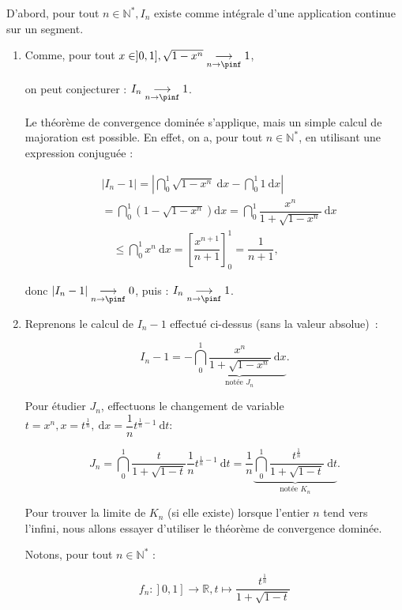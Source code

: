 

D'abord, pour tout $n \in \mathbb{N}^{*}, I_{n}$ existe comme intégrale d'une application continue sur un segment.
\begin{enumerate}
\item Comme, pour tout $x \in] 0,1], \sqrt{1-x^{n}} \underset{n\to\pinf}{\longrightarrow} 1$,

on peut conjecturer : $I_{n} \underset{n\to\pinf}{\longrightarrow} 1$.

Le théorème de convergence dominée s'applique, mais un simple calcul de majoration est possible. En effet, on a, pour tout $n \in \mathbb{N}^{*}$, en utilisant une expression conjuguée :

$$
\begin{aligned}
& \left|I_{n}-1\right|=\left|\dint_{0}^{1} \sqrt{1-x^{n}} \mathrm{~d} x-\dint_{0}^{1} 1 \mathrm{~d} x\right| \\
& =\dint_{0}^{1}\left(1-\sqrt{1-x^{n}}\right) \mathrm{d} x=\dint_{0}^{1} \dfrac{x^{n}}{1+\sqrt{1-x^{n}}} \mathrm{~d} x \\
& \quad \leqslant \dint_{0}^{1} x^{n} \mathrm{~d} x=\left[\dfrac{x^{n+1}}{n+1}\right]_{0}^{1}=\dfrac{1}{n+1},
\end{aligned}
$$

donc $\left|I_{n}-1\right| \underset{n\to\pinf}{\longrightarrow} 0$, puis : $I_{n} \underset{n\to\pinf}{\longrightarrow} 1$.
\item  Reprenons le calcul de $I_{n}-1$ effectué ci-dessus (sans la valeur absolue)~:

$$
I_{n}-1=-\underbrace{\dint_{0}^{1} \dfrac{x^{n}}{1+\sqrt{1-x^{n}}} \mathrm{~d} x}_{\text {notée } J_{n}} .
$$

Pour étudier $J_{n}$, effectuons le changement de variable $t=x^{n}, x=t^{\frac{1}{n}}, \mathrm{~d} x=\dfrac{1}{n} t^{\frac{1}{n}-1} \mathrm{~d} t:$

$$
J_{n}=\dint_{0}^{1} \dfrac{t}{1+\sqrt{1-t}} \dfrac{1}{n} t^{\frac{1}{n}-1} \mathrm{~d} t=\dfrac{1}{n} \underbrace{\dint_{0}^{1} \dfrac{t^{\frac{1}{n}}}{1+\sqrt{1-t}} \mathrm{~d} t}_{\text {notée } K_{n}} .
$$

Pour trouver la limite de $K_{n}$ (si elle existe) lorsque l'entier $n$ tend vers l'infini, nous allons essayer d'utiliser le théorème de convergence dominée.

Notons, pour tout $n \in \mathbb{N}^{*}$ :

$$
\left.\left.f_{n}:\right] 0,1\right] \longrightarrow \mathbb{R}, t \longmapsto \dfrac{t^{\frac{1}{n}}}{1+\sqrt{1-t}}
$$


\end{enumerate}
